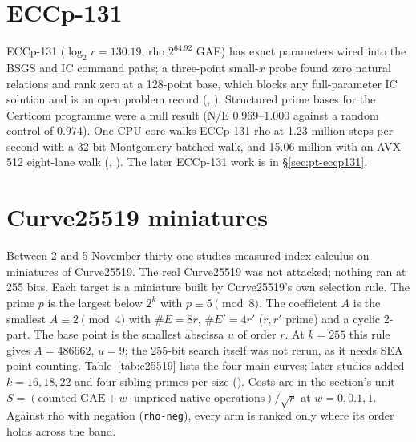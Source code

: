 \section{ECCp-131}

ECCp-131 ($\log_2 r=130.19$, rho $2^{64.92}$ GAE) has exact parameters wired
into the BSGS and IC command paths; a three-point small-$x$ probe found zero
natural relations and rank zero at a 128-point base, which blocks any
full-parameter IC solution and is an open problem record
(,
). Structured prime
bases for the Certicom programme were a null result (N/E $0.969$--$1.000$
against a random control of $0.974$). One CPU core walks ECCp-131 rho at
1.23 million steps per second with a 32-bit Montgomery batched walk, and
15.06 million with an AVX-512 eight-lane walk
(,
). The later ECCp-131 work is
in \S\ref{sec:pt-eccp131}.

\section{Curve25519 miniatures}\label{sec:c25519}

Between 2 and 5 November thirty-one studies measured index calculus on
miniatures of Curve25519. The real Curve25519 was not attacked; nothing ran at
255 bits. Each target is a miniature built by Curve25519's own selection
rule. The prime $p$ is the largest below $2^k$ with $p\equiv5\pmod 8$. The
coefficient $A$ is the smallest $A\equiv2\pmod4$ with $\#E=8r$,
$\#E'=4r'$ ($r,r'$ prime) and a cyclic 2-part. The base point is the
smallest abscissa $u$ of order $r$. At $k=255$ this rule gives
$A=486662$, $u=9$; the 255-bit search itself was not rerun, as it needs SEA
point counting. Table~\ref{tab:c25519} lists the four main curves; later studies added
$k=16,18,22$ and four sibling primes per size
(). Costs are in the
section's unit $S=(\text{counted GAE}+w\cdot\text{unpriced native
operations})/\sqrt r$ at $w=0,0.1,1$. Against rho with negation
(\texttt{rho-neg}), every arm is ranked only where its order holds across
the band.

